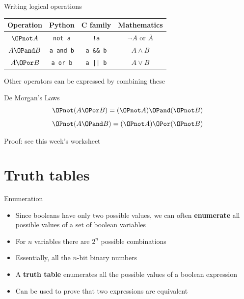 \begin{frame}[fragile]{Writing logical operations}
	\pause
	\centering
	\begin{tabular}{|c||c|c|c|}
		\hline
		Operation & Python & C family & Mathematics \\\hline
		$\OPnot A$
			& \texttt{not a}
			& \texttt{!a}
			& $\neg A$ {\huge\phantom{$I$}} or {\huge\phantom{$I$}} $\overline{A}$
			\pause\\
		$A \OPand B$ 
			& \texttt{a and b}
			& \texttt{a \&\& b}
			& $A \wedge B$
			\pause\\
		$A \OPor B$ 
			& \texttt{a or b}
			& \texttt{a || b}
			& $A \vee B$
			\\\hline
	\end{tabular}
	\pause
	\par\vspace{2ex}\par
	Other operators can be expressed by combining these
\end{frame}

\begin{frame}{De Morgan's Laws}
	\pause
	$$ \OPnot (A \OPor B) = (\OPnot A) \OPand (\OPnot B) $$
	\pause
	$$ \OPnot (A \OPand B) = (\OPnot A) \OPor (\OPnot B) $$
	\pause
	\vspace{3ex}
	\begin{center}
		Proof: see this week's worksheet
	\end{center}
\end{frame}

\part{Truth tables}
\frame{\partpage}

\begin{frame}{Enumeration}
	\begin{itemize}
		\pause\item Since booleans have only two possible values, we can often \textbf{enumerate}
			all possible values of a set of boolean variables
		\pause\item For $n$ variables there are $2^n$ possible combinations
		\pause\item Essentially, all the $n$-bit binary numbers
		\pause\item A \textbf{truth table} enumerates all the possible values of a boolean expression
		\pause\item Can be used to prove that two expressions are equivalent
	\end{itemize}
\end{frame}

